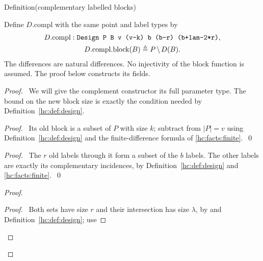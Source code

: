 \begin{mergedproofsection}
\begin{namedresult}{Definition}{(complementary labelled blocks)}\label{hc:def:compl}
 \leavevmode\par
 Define $D.\mathrm{compl}$ with the same point and label types by
 \[
 \begin{gathered}
 D.\mathrm{compl}:\texttt{Design P B v (v-k) b (b-r) (b+lam-2*r)},\\
 D.\mathrm{compl}.\mathrm{block}(B)\triangleq P\mathbin{\mkern-1.5mu\setminus\mkern-1.5mu} D(B).
 \end{gathered}
 \]
 The differences are natural differences. No injectivity of the
 block function is assumed. The proof below constructs its fields.
\end{namedresult}
\begin{proof}
 \pfsketch\ We will give the complement constructor its full
 parameter type. The bound on the new block size is exactly the
 condition needed by Definition~\ref{hc:def:design}.
 \begin{proof}\pf\ Its old block is a subset of $P$ with size $k$;
  subtract from $|P|=v$ using Definition~\ref{hc:def:design}
  and the finite-difference formula of \ref{hc:facts:finite}.~\qed\end{proof}
 \begin{proof}\pf\ The $r$ old labels through it form a subset of
  the $b$ labels. The other labels are exactly its complementary
  incidences, by Definition~\ref{hc:def:design} and \ref{hc:facts:finite}.~\qed\end{proof}
 \begin{proof}
  \begin{proof}\pf\ Both sets have size $r$ and their intersection
   has size $\lambda$, by  and Definition~\ref{hc:def:design}; use

\end{proof}
\end{proof}
\end{proof}
\end{mergedproofsection}
